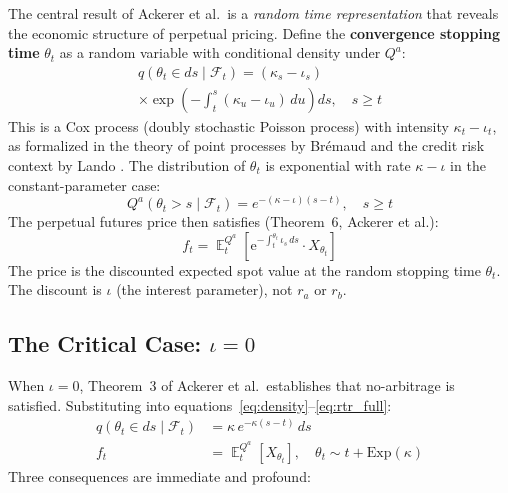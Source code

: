 \documentclass[10pt,twocolumn]{article}
\theoremstyle{plain}
\theoremstyle{definition}
\DeclareMathOperator{\E}{\mathbb{E}}
\newcommand{\Qa}{Q^a}
\newcommand{\F}{\mathcal{F}}
\begin{document}
The central result of Ackerer et al.\ is a \textit{random time
representation} that reveals the economic structure of perpetual
pricing. Define the \textbf{convergence stopping time} $\theta_t$
as a random variable with conditional density under $\Qa$:
\begin{multline}
q(\theta_t \in ds \mid \F_t)
= (\kappa_s - \iota_s)\\
\times\exp\!\left(-\int_t^s (\kappa_u - \iota_u)\,du\right)ds,
\quad s\geq t
\label{eq:density}
\end{multline}
This is a Cox process (doubly stochastic Poisson process) with
intensity $\kappa_t - \iota_t$, as formalized in the theory of
point processes by Brémaud \cite{Bremaud1981} and the credit risk
context by Lando \cite{Lando1998}. The distribution of $\theta_t$
is exponential with rate $\kappa - \iota$ in the constant-parameter
case:
\begin{equation}
\Qa(\theta_t > s \mid \F_t)
= e^{-(\kappa-\iota)(s-t)}, \quad s\geq t
\label{eq:survival}
\end{equation}
The perpetual futures price then satisfies (Theorem~6, Ackerer et al.):
\begin{equation}
f_t = \E^{\Qa}_t\!\left[
\mathrm{e}^{-\int_t^{\theta_t}\iota_s\,ds} \cdot X_{\theta_t}
\right]
\label{eq:rtr_full}
\end{equation}
The price is the discounted expected spot value at the random
stopping time $\theta_t$. The discount is $\iota$ (the interest
parameter), not $r_a$ or $r_b$.

\subsection{The Critical Case: $\iota = 0$}
\label{sec:iota_zero}

When $\iota = 0$, Theorem~3 of Ackerer et al.\ establishes that
no-arbitrage is satisfied. Substituting into
equations~\eqref{eq:density}--\eqref{eq:rtr_full}:
\begin{align}
q(\theta_t \in ds \mid \F_t) &= \kappa\,e^{-\kappa(s-t)}\,ds
\label{eq:density_zero}\\[4pt]
f_t &= \E^{\Qa}_t[X_{\theta_t}],
\quad \theta_t \sim t + \mathrm{Exp}(\kappa)
\label{eq:perp_iota_zero}
\end{align}
Three consequences are immediate and profound:
\end{document}
